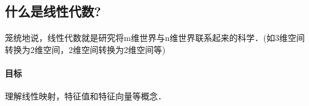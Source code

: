 \documentclass[a4paper]{article}
\begin{document}
\begin{CJK}{UTF8}{gbsn}
\section{什么是线性代数?}
\paragraph{}
笼统地说，线性代数就是研究将m维世界与n维世界联系起来的科学．(如3维空间转换为2维空间，2维空间转换为2维空间等)
\paragraph{目标}
理解线性映射，特征值和特征向量等概念．
\end{CJK}
\end{document}
